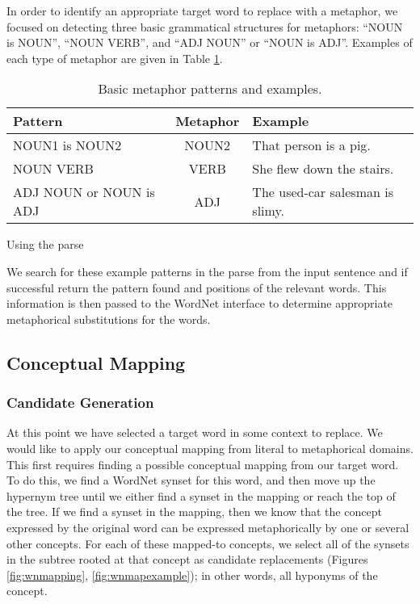 \documentclass[12pt]{article}
\begin{document}
In order to identify an appropriate target word to replace with a metaphor, we focused on detecting three basic grammatical structures for metaphors: ``NOUN is NOUN'', ``NOUN VERB'', and ``ADJ NOUN'' or ``NOUN is ADJ''.  Examples of each type of metaphor are given in Table \ref{tab:metaphorexamples}.

\begin{table}[h]
	\centering
	\small
	\begin{tabular}{|l|c|l|} \hline
		\textbf{Pattern} & \textbf{Metaphor} & \textbf{Example}\\	\hline
		NOUN1 is NOUN2 & NOUN2 & That person is a pig.\\ \hline
		NOUN VERB & VERB & She flew down the stairs.\\ \hline
		ADJ NOUN or NOUN is ADJ & ADJ & The used-car salesman is slimy.\\ \hline
	\end{tabular}
	\caption{Basic metaphor patterns and examples.}
	\label{tab:metaphorexamples}
\end{table}

Using the parse 

We search for these example patterns in the parse from the input sentence and if successful return the pattern found and positions of the relevant words.  This information is then passed to the WordNet interface to determine appropriate metaphorical substitutions for the words.

\subsection{Conceptual Mapping}

\subsubsection{Candidate Generation}

At this point we have selected a target word in some context to replace. We would like to apply our conceptual mapping from literal to metaphorical domains. This first requires finding a possible conceptual mapping from our target word. To do this, we find a WordNet synset for this word, and then move up the hypernym tree until we either find a synset in the mapping or reach the top of the tree. If we find a synset in the mapping, then we know that the concept expressed by the original word can be expressed metaphorically by one or several other concepts. For each of these mapped-to concepts, we select all of the synsets in the subtree rooted at that concept as candidate replacements (Figures \ref{fig:wnmapping}, \ref{fig:wnmapexample}); in other words, all hyponyms of the concept.
\end{document}
